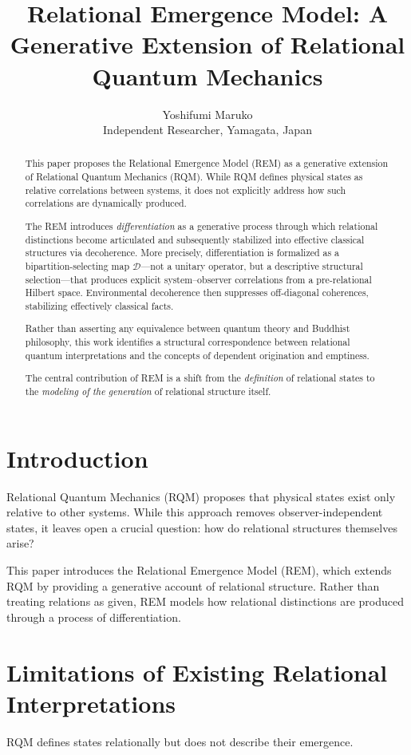 \documentclass{article}
\title{Relational Emergence Model: A Generative Extension of Relational Quantum Mechanics}
\author{Yoshifumi Maruko \\ Independent Researcher, Yamagata, Japan}
\date{}
\begin{document}
\maketitle

\begin{abstract}
This paper proposes the Relational Emergence Model (REM) as a generative extension of Relational Quantum Mechanics (RQM). While RQM defines physical states as relative correlations between systems, it does not explicitly address how such correlations are dynamically produced.

The REM introduces \emph{differentiation} as a generative process through which relational distinctions become articulated and subsequently stabilized into effective classical structures via decoherence. More precisely, differentiation is formalized as a bipartition-selecting map $\mathcal{D}$---not a unitary operator, but a descriptive structural selection---that produces explicit system--observer correlations from a pre-relational Hilbert space. Environmental decoherence then suppresses off-diagonal coherences, stabilizing effectively classical facts.

Rather than asserting any equivalence between quantum theory and Buddhist philosophy, this work identifies a structural correspondence between relational quantum interpretations and the concepts of dependent origination and emptiness.

The central contribution of REM is a shift from the \emph{definition} of relational states to the \emph{modeling of the generation} of relational structure itself.
\end{abstract}

\section{Introduction}
Relational Quantum Mechanics (RQM) proposes that physical states exist only relative to other systems. While this approach removes observer-independent states, it leaves open a crucial question: how do relational structures themselves arise?

This paper introduces the Relational Emergence Model (REM), which extends RQM by providing a generative account of relational structure. Rather than treating relations as given, REM models how relational distinctions are produced through a process of differentiation.

\section{Limitations of Existing Relational Interpretations}
RQM defines states relationally but does not describe their emergence.
\end{document}
